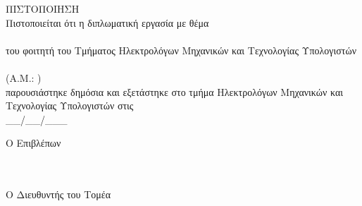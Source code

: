 \pagestyle{empty}
\begin{center}
{\LARGE ΠΙΣΤΟΠΟΙΗΣΗ\\[1cm]}
\large Πιστοποιείται ότι η διπλωματική εργασία με θέμα\\[1cm]
\textbf{\large \doctitlegr }\\[1cm]
του φοιτητή του Τμήματος Ηλεκτρολόγων Μηχανικών και Τεχνολογίας Υπολογιστών\\[1.5cm]
\megr \\[0.5cm]
(Α.Μ.: \studnum )\\[1.5cm]
παρουσιάστηκε δημόσια και εξετάστηκε στο τμήμα  Ηλεκτρολόγων Μηχανικών και Τεχνολογίας Υπολογιστών στις\\[1cm]
\Large{\_\_/\_\_/\_\_\_}\\[1.5cm]
\end{center}
\begin{minipage}{0.5\textwidth}
\begin{flushleft} \large
Ο Επιβλέπων\\[2cm]
\supnamegr \\
\emph{\suptitlegr}\\[1cm]
\end{flushleft}
\end{minipage}
\begin{minipage}{0.5\textwidth}
\begin{flushright} \large
Ο Διευθυντής του Τομέα\\[2cm]
\headofdivisiongr\\
\emph{\headofdivisiontitlegr}
\end{flushright}
\end{minipage}
